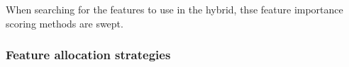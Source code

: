When searching for the features to use in the hybrid, thse feature importance scoring methods are swept.


\subsubsection{Feature allocation strategies}
